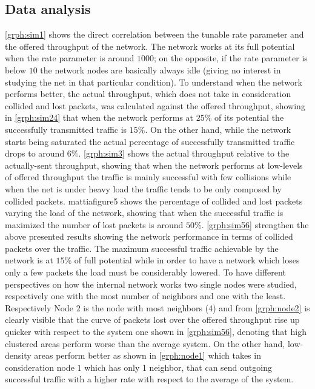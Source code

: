 \documentclass[conference]{IEEEtran}
\begin{document}
\subsection{Data analysis}\label{sec:dataanalysis}
\cref{grph:sim1} shows the direct correlation between the tunable rate parameter and the offered throughput of the network. The network works at its full potential when the rate parameter is around \(1000\); on the opposite, if the rate parameter is below \(10\) the network nodes are basically always idle (giving no interest in studying the net in that particular condition). To understand when the network performs better, the actual throughput, which does not take in consideration collided and lost packets, was calculated against the offered throughput, showing in \cref{grph:sim24} that when the network performs at \(25\%\) of its potential the successfully transmitted traffic is \(15\%\). On the other hand, while the network starts being saturated the actual percentage of successfully transmitted traffic drops to around \(6\%\). \cref{grph:sim3} shows the actual throughput relative to the actually-sent throughput, showing that when the network performs at low-levels of offered throughput the traffic is mainly successful with few collisions while when the net is under heavy load the traffic tends to be only composed by collided packets. mattiafigure5 shows the percentage of collided and lost packets varying the load of the network, showing that when the successful traffic is maximized the number of lost packets is around \(50\%\). \cref{grph:sim56} strengthen the above presented results showing the network performance in terms of collided packets over the traffic. The maximum successful traffic achievable by the network is at \(15\%\) of full potential while in order to have a network which loses only a few packets the load must be considerably lowered. To have different perspectives on how the internal network works two single nodes were studied, respectively one with the most number of neighbors and one with the least. Respectively Node \(2\) is the node with most neighbors (4) and from \cref{grph:node2} is clearly visible that the curve of packets lost over the offered throughput rise up quicker with respect to the system one shown in \cref{grph:sim56}, denoting that high clustered areas perform worse than the average system. On the other hand, low-density areas perform better as shown in \cref{grph:node1} which takes in consideration node \(1\) which has only 1 neighbor, that can send outgoing successful traffic with a higher rate with respect to the average of the system.
\end{document}

